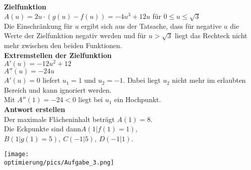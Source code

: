 \begin{Answer}[ref=optimierungA3]\\
	\begin{minipage}{\textwidth}
		\begin{minipage}{.5\textwidth}\raggedright
			\textbf{Zielfunktion}\\
			\(A(u)=2u\cdot \left(g(u)-f(u)\right)=-4u^3+12u\) für \(0\leq u\leq \sqrt{3}\)\\
			Die Einschränkung für \(u\) ergibt sich aus der Tatsache, dass für negative \(u\) die Werte der Zielfunktion negativ werden und für \(u>\sqrt{3}\) liegt das Rechteck nicht mehr zwischen den beiden Funktionen.\\
			\textbf{Extremstellen der Zielfunktion}\\
			\(A'(u)=-12u^2+12\)\\
			\(A''(u)=-24u\)\\
			\(A'(u)=0\) liefert \(u_1=1\) und \(u_2=-1\). Dabei liegt \(u_2\) nicht mehr im erlaubten Bereich und kann ignoriert werden.\\
			Mit \(A''(1)=-24<0\) liegt bei \(u_1\) ein Hochpunkt.\\
			\textbf{Antwort erstellen}\\
			Der maximale Flächeninhalt beträgt \(A\left(1\right)=8\).\\
			Die Eckpunkte sind dann\(A(1\vert f(1)=1),\)\\\(B(1\vert g(1)=5),\ C(-1\vert 5),\ D(-1\vert 1)\).
		\end{minipage}
		\begin{minipage}{.5\textwidth}
			\texttt{[image: \\optimierung/pics/Aufgabe\_3.png]}
		\end{minipage}
	\end{minipage}
\end{Answer}
